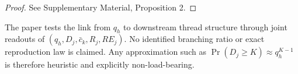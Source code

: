 \begin{proof}
See Supplementary Material, Proposition 2.
\end{proof}

\begin{remark}
The paper tests the link from \(q_h\) to downstream thread structure through
joint readouts of \((q_h,D_j,\bar c_k,R_j,RE_j)\). No identified branching
ratio or exact reproduction law is claimed. Any approximation such as
\(\Pr(D_j\ge K)\approx q_h^{K-1}\) is therefore heuristic and explicitly
non-load-bearing.
\end{remark}
